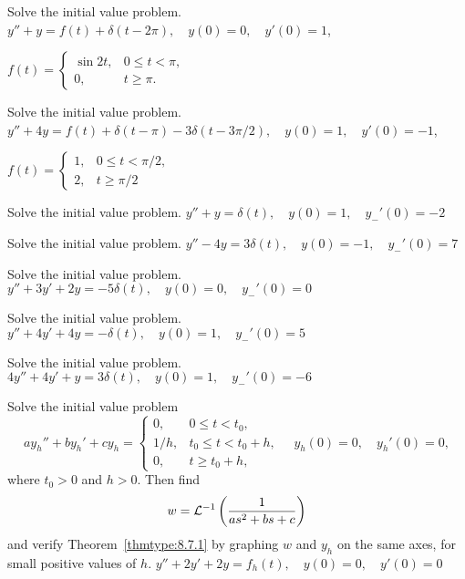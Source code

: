 \documentclass{ximera}
\begin{document}
\begin{problem}\label{exer:8.7.19}
Solve the initial value
problem.
$y''+y=f(t)+\delta(t-2\pi), \quad  y(0)=0,\quad y'(0)=1$, 

$f(t)=\left\{\begin{array}{cl}
\sin2t,&0\le t<\pi,\\0,&t\ge \pi.\end{array}\right.$
\end{problem}

\begin{problem}\label{exer:8.7.20}
Solve the initial value
problem.
$y''+4y=f(t)+\delta(t-\pi)-3\delta(t-3\pi/2), \quad  y(0)=1,\quad
y'(0)=-1$, 

$f(t)=\left\{\begin{array}{cl}1,&0\le t<\pi/2,\\2,&t\ge
\pi/2\end{array}\right.$
\end{problem}

\begin{problem}\label{exer:8.7.21}
Solve the initial value
problem.
$y''+y=\delta(t), \quad  y(0)=1,\quad y_-'(0)=-2$
\end{problem}

\begin{problem}\label{exer:8.7.22}
Solve the initial value
problem.
$y''-4y=3\delta(t), \quad  y(0)=-1,\quad y_-'(0)=7$
\end{problem}

\begin{problem}\label{exer:8.7.23}
Solve the initial value
problem.
$y''+3y'+2y=-5\delta(t), \quad  y(0)=0,\quad y_-'(0)=0$
\end{problem}

\begin{problem}\label{exer:8.7.24}
Solve the initial value
problem.
$y''+4y'+4y=-\delta(t), \quad  y(0)=1,\quad y_-'(0)=5$
\end{problem}

\begin{problem}\label{exer:8.7.25}
Solve the initial value
problem.
$4y''+4y'+y=3\delta(t), \quad  y(0)=1,\quad y_-'(0)=-6$
\end{problem}

\begin{problem}\label{exer:8.7.26} Solve the initial value problem
$$
ay_h''+by_h'+cy_h=
\left\{\begin{array}{cl} 0,&0\le t<t_0,\\
1/h,&t_0\le t< t_0+h,\\
0,&t\ge t_0+h,\end{array}\right.
\quad y_h(0)=0,\quad y_h'(0)=0,
$$
where $t_0>0$ and $h>0$. Then find
$$
w={\cal L}^{-1}\left(\frac{1}{as^2+bs+c}\right)
$$
and verify Theorem~\ref{thmtype:8.7.1} by graphing $w$ and $y_h$
on the same axes, for small positive values of $h$.
$y''+2y'+2y=f_h(t), \quad  y(0)=0,\quad y'(0)=0$
\end{problem}
\end{document}
